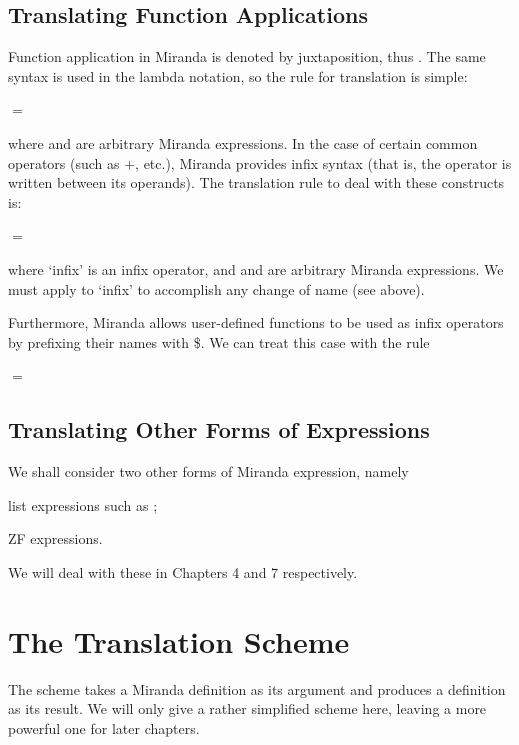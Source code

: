\subsection{Translating Function Applications}
Function application in Miranda is denoted by juxtaposition, thus . The same syntax is used in the lambda notation, so the rule for translation is simple:
\begin{mlcoded}
     $=$  
\end{mlcoded}
where  and  are arbitrary Miranda expressions. In the case of certain common operators (such as $+$, etc.), Miranda provides infix syntax (that is, the operator is written between its operands). The translation rule to deal with these constructs is:

\begin{mlcoded}
     $=$   
\end{mlcoded}
where `infix' is an infix operator, and  and  are arbitrary Miranda expressions. We must apply  to `infix' to accomplish any change of name (see above).

Furthermore, Miranda allows user-defined functions to be used as infix operators by prefixing their names with \$. We can treat this case with the rule

\begin{mlcoded}
     $=$   
\end{mlcoded}

\subsection{Translating Other Forms of Expressions}
We shall consider two other forms of Miranda expression, namely

\begin{numbered}
\item list expressions such as \ml{[2,5,1]};
\item ZF expressions.

\end{numbered}
We will deal with these in Chapters 4 and 7 respectively.

\section{The  Translation Scheme}
The  scheme takes a Miranda definition as its argument and produces a  definition as its result. We will only give a rather simplified  scheme here, leaving a more powerful one for later chapters.


